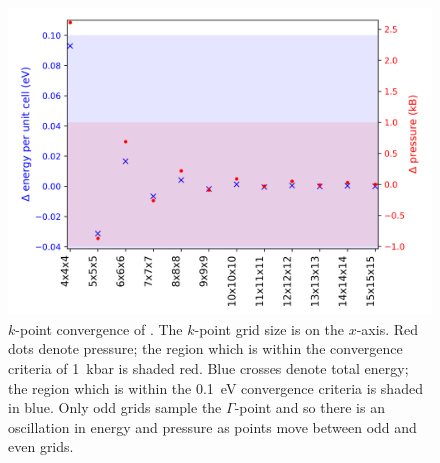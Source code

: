 \begin{figure}[h]
\centering
  \includegraphics[width=0.7\columnwidth]{figures/ch3/kpointconvergence.png}
  \caption[ $k$-point convergence]{$k$-point convergence of . The $k$-point grid size is on the $x$-axis. Red dots denote pressure; the region which is within the convergence criteria of \SI{1}{\kilo\bar} is shaded red. Blue crosses denote total energy; the region which is within the \SI{0.1}{\electronvolt} convergence criteria is shaded in blue. Only odd grids sample the $\Gamma$-point and so there is an oscillation in energy and pressure as points move between odd and even grids.}
  \label{kpointconvergence}
\end{figure}




